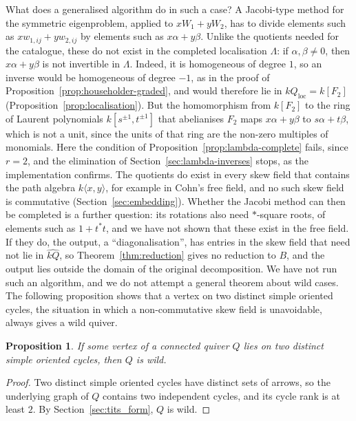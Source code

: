 \documentclass[12pt, a4paper]{report}
\theoremstyle{plain}
\newtheorem{proposition}[theorem]{Proposition}
\theoremstyle{definition}
\theoremstyle{remark}
\theoremstyle{plain}
\begin{document}
What does a generalised algorithm do in such a case? A Jacobi-type method for the symmetric eigenproblem, applied to $xW_1+yW_2$, has to divide elements such as $xw_{1,ij}+yw_{2,ij}$ by elements such as $x\alpha+y\beta$. Unlike the quotients needed for the catalogue, these do not exist in the completed localisation $\Lambda$: if $\alpha,\beta\neq0$, then $x\alpha+y\beta$ is not invertible in $\Lambda$. Indeed, it is homogeneous of degree $1$, so an inverse would be homogeneous of degree $-1$, as in the proof of Proposition~\ref{prop:householder-graded}, and would therefore lie in $kQ_{\mathrm{loc}}=k[F_2]$ (Proposition~\ref{prop:localisation}). But the homomorphism from $k[F_2]$ to the ring of Laurent polynomials $k[s^{\pm1},t^{\pm1}]$ that abelianises $F_2$ maps $x\alpha+y\beta$ to $s\alpha+t\beta$, which is not a unit, since the units of that ring are the non-zero multiples of monomials. Here the condition of Proposition~\ref{prop:lambda-complete} fails, since $r=2$, and the elimination of Section~\ref{sec:lambda-inverses} stops, as the implementation confirms. The quotients do exist in every skew field that contains the path algebra $k\langle x,y\rangle$, for example in Cohn's free field, and no such skew field is commutative (Section~\ref{sec:embedding}). Whether the Jacobi method can then be completed is a further question: its rotations also need $*$-square roots, of elements such as $1+t^*t$, and we have not shown that these exist in the free field. If they do, the output, a ``diagonalisation'', has entries in the skew field that need not lie in $\widehat{kQ}$, so Theorem~\ref{thm:reduction} gives no reduction to $B$, and the output lies outside the domain of the original decomposition. We have not run such an algorithm, and we do not attempt a general theorem about wild cases. The following proposition shows that a vertex on two distinct simple oriented cycles, the situation in which a non-commutative skew field is unavoidable, always gives a wild quiver.

\begin{proposition}\label{prop:two-cycles-wild}
If some vertex of a connected quiver $Q$ lies on two distinct simple oriented cycles, then $Q$ is wild.
\end{proposition}
\begin{proof}
Two distinct simple oriented cycles have distinct sets of arrows, so the underlying graph of $Q$ contains two independent cycles, and its cycle rank is at least $2$. By Section~\ref{sec:tits_form}, $Q$ is wild.
\end{proof}
\end{document}
